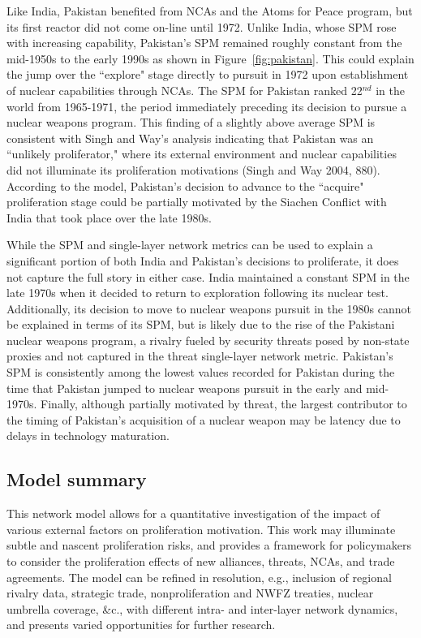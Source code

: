 \documentclass{article} %
\begin{document}
{Like India, Pakistan benefited from NCAs and the Atoms for Peace program, but its first reactor did not come on-line until 1972. Unlike India, whose SPM rose with increasing capability, Pakistan's SPM remained roughly constant from the mid-1950s to the early 1990s as shown in Figure~\ref{fig:pakistan}. This could explain the jump over the ``explore" stage directly to pursuit in 1972 upon establishment of nuclear capabilities through NCAs. The SPM for Pakistan ranked 22$^{nd}$ in the world from 1965-1971, the period immediately preceding its decision to pursue a nuclear weapons program. This finding of a slightly above average SPM is consistent with Singh and Way's analysis indicating that Pakistan was an ``unlikely proliferator," where its external environment and nuclear capabilities did not illuminate its proliferation motivations (Singh and Way 2004, 880). According to the model, Pakistan's decision to advance to the ``acquire" proliferation stage could be partially motivated by the Siachen Conflict with India that took place over the late 1980s.

While the SPM and single-layer network metrics can be used to explain a significant portion of both India and Pakistan's decisions to proliferate, it does not capture the full story in either case. India maintained a constant SPM in the late 1970s when it decided to return to exploration following its nuclear test. Additionally, its decision to move to nuclear weapons pursuit in the 1980s cannot be explained in terms of its SPM, but is likely due to the rise of the Pakistani nuclear weapons program, a rivalry fueled by security threats posed by non-state proxies and not captured in the threat single-layer network metric. Pakistan's SPM is consistently among the lowest values recorded for Pakistan during the time that Pakistan jumped to nuclear weapons pursuit in the early and mid-1970s. Finally, although partially motivated by threat, the largest contributor to the timing of Pakistan's acquisition of a nuclear weapon may be latency due to delays in technology maturation. 


\subsection{Model summary}

This network model allows for a quantitative investigation of the impact of various external factors on proliferation motivation. This work may illuminate subtle and nascent proliferation risks, and provides a framework for policymakers to consider the proliferation effects of new alliances, threats, NCAs, and trade agreements. The model can be refined in resolution, e.g., inclusion of regional rivalry data, strategic trade, nonproliferation and NWFZ treaties, nuclear umbrella coverage, \&c., with different intra- and inter-layer network dynamics, and presents varied opportunities for further research. 

}
\end{document}
